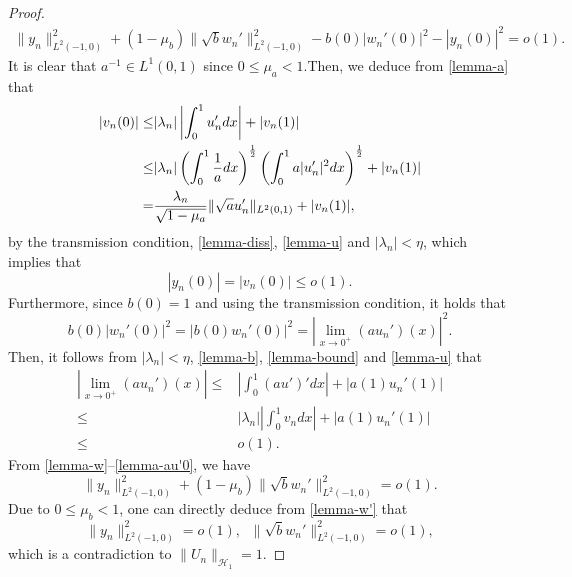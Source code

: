 \documentclass[twoside]{article}
\theoremstyle{noparens}
\theoremstyle{definition}
\numberwithin{equation}{section}
\numberwithin{figure}{section}
\begin{document}
\begin{proof}
\begin{equation}
\begin{gathered}
		\|y_n\|_{L^2(-1,0)}^2
		+ (1-\mu_b)\|\sqrt{b}w_n'\|^2_{L^2(-1,0)}
		- b(0)|w_n'(0)|^2-|y_n(0)|^2
		= o(1).
	\end{gathered}
\end{equation}
It is clear that $a^{-1}\in L^1(0,1)$ since $0\leq \mu_a<1$.Then, we deduce from \eqref{lemma-a} that
\begin{equation}\label{lemma-v0}
	\begin{split}
		|v_n(0)| \leq &|\lambda_n|\left|\int_0^1 u_n' dx\right| + |v_n(1)|\\
		\leq& |\lambda_n|\left(\int_{0}^1 {1\over a} dx\right)^{1\over2}
		\left(\int_0^1 a|u_n'|^2dx\right)^{1\over2} + |v_n(1)|\\
		= & {\lambda_n\over\sqrt{1-\mu_a}}
		\|\sqrt{a}u_n'\|_{L^2(0,1)} + |v_n(1)|,
	\end{split}
\end{equation}
by the transmission condition, \eqref{lemma-diss}, \eqref{lemma-u} and $|\lambda_n|<\eta$,  which implies that
\begin{equation}\label{lemma-y0}
	|y_n(0)| = |v_n(0)| \leq o(1).
\end{equation}
Furthermore, since $b(0) =1$ and using the transmission condition, it holds that
\begin{equation}\label{lemma-bw'0}
	b(0)|w_n'(0)|^2 = |b(0)w_n'(0)|^2 = \left|\lim_{x\to 0^+}(au_n')(x)\right|^2.
\end{equation}
Then, it follows from $|\lambda_n|<\eta$, \eqref{lemma-b}, \eqref{lemma-bound} and \eqref{lemma-u} that
\begin{equation}\label{lemma-au'0}
	\begin{split}
		\left|\lim_{x\to 0^+}(au_n')(x)\right|
		\leq& \left|\int_0^1 (au')' dx\right| + |a(1)u_n'(1)|\\
		\leq& |\lambda_n|\left|\int_0^1 v_n dx\right| + |a(1)u_n'(1)|\\
		\leq& o(1).
	\end{split}
\end{equation}
From \eqref{lemma-w}--\eqref{lemma-au'0}, we have
\begin{equation}\label{lemma-w'}
	\|y_n\|_{L^2(-1,0)}^2 + (1-\mu_b)\|\sqrt{b}w_n'\|_{L^2(-1,0)}^2 = o(1).
\end{equation}
Due to $0\leq\mu_b<1$, one can directly deduce from \eqref{lemma-w'} that
$$\|y_n\|_{L^2(-1,0)}^2=o(1), \;\;
\|\sqrt{b}w_n'\|_{L^2(-1,0)}^2 = o(1),$$
which is a contradiction to $\|U_n\|_{\mathcal H_1} = 1$.


\end{proof}
\end{document}
